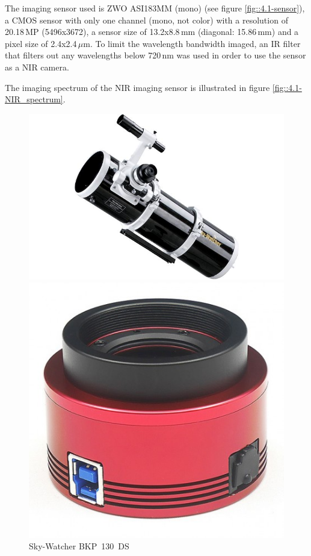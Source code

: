 The imaging sensor used is ZWO ASI183MM (mono) (see figure \ref{fig::4.1-sensor}), a CMOS sensor with only one channel (mono, not color) with a resolution of 20.18\,MP (5496x3672), a sensor size of 13.2x8.8\,mm (diagonal: 15.86\,mm) and a pixel size of 2.4x2.4\,$\mu$m. To limit the wavelength bandwidth imaged, an IR filter that filters out any wavelengths below 720\,nm was used in order to use the sensor as a NIR camera.

The imaging spectrum of the NIR imaging sensor is illustrated in figure \ref{fig::4.1-NIR_spectrum}.

\begin{figure}[h]
	\centering
	\begin{minipage}[t]{0.3\linewidth}
		\centering
		\includegraphics[width=1.0\linewidth]{4-experiment-design/img/setup/SkyWatcher_BKP130DS}
		\caption{Sky-Watcher BKP~130~DS}
		\label{fig::4.1-telescope}
	\end{minipage}
	\hspace{0.03\linewidth}
	\begin{minipage}[t]{0.3\linewidth}
		\centering
		\includegraphics[width=0.65\linewidth]{4-experiment-design/img/setup/ZWO_ASI183MM}

\end{minipage}
\end{figure}
